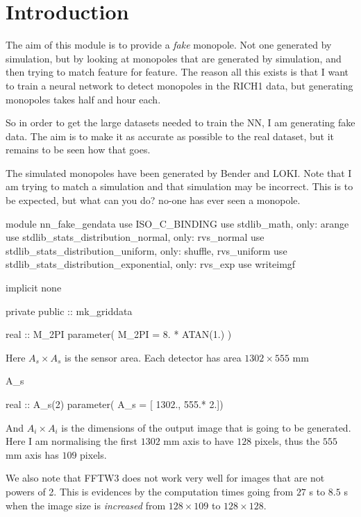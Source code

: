 \documentclass[10pt, a4paper]{article}
\begin{document}
\section{Introduction}

The aim of this module is to provide a \emph{fake} monopole. Not one generated by simulation, but by looking at monopoles that are generated by simulation, and then trying to match feature for feature. 
The reason all this exists is that I want to train a neural network to detect monopoles in the RICH1 data, but generating monopoles takes half and hour each. 

So in order to get the large datasets needed to train the NN, I am generating fake data. 
The aim is to make it as accurate as possible to the real dataset, but it remains to be seen how that goes. 

The simulated monopoles have been generated by Bender and LOKI. Note that I am trying to match a simulation and that simulation may be incorrect. This is to be expected, but what can you do? no-one has ever seen a monopole. 

\begin{code}
module nn_fake_gendata
	use ISO_C_BINDING
	use stdlib_math, only: arange
	use stdlib_stats_distribution_normal, only: rvs_normal 
	use stdlib_stats_distribution_uniform, only: shuffle, rvs_uniform
	use stdlib_stats_distribution_exponential, only: rvs_exp
	use writeimgf
	
	implicit none
	
	private 
	public :: mk_griddata
	
	real :: M_2PI
	parameter( M_2PI = 8. * ATAN(1.) )
\end{code}

Here $A_s \times A_s$ is the sensor area. Each detector has area $1302 \times 555$ \si{\milli \metre}

\begin{codevar}{A_s}
\begin{code}
	real :: A_s(2)
	parameter( A_s = [ 1302., 555.* 2.])
\end{code}
\end{codevar}

And $A_i \times A_i$ is the dimensions of the output image that is going to be generated. Here I am normalising the first $1302$ \si{\milli \metre} axis to have $128$ pixels, thus the $555$ \si{\milli \metre} axis has $109$ pixels.

We also note that FFTW3 does not work very well for images that are not powers of 2. This is evidences by the computation times going from $27$ \si{\second} to $8.5$ \si{\second} when the image size is \emph{increased} from $128 \times 109$ to $128 \times 128$.
\end{document}
